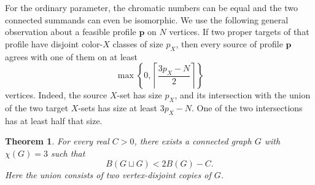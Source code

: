 \documentclass[11pt,reqno]{amsart}
\numberwithin{equation}{section}
\newtheorem{theorem}{Theorem}[section]
\theoremstyle{definition}
\theoremstyle{remark}
\begin{document}
For the ordinary parameter, the chromatic numbers can be equal and
the two connected summands can even be isomorphic. We use the following
general observation about a feasible profile $\mathbf p$ on $N$ vertices.
If two proper targets of that profile have disjoint color-$X$ classes
of size $p_X$, then every source of profile $\mathbf p$ agrees with one
of them on at least
\begin{equation}\label{union:disjoint-class-bound}
 \max\left\{0,\left\lceil\frac{3p_X-N}{2}\right\rceil\right\}
\end{equation}
vertices. Indeed, the source $X$-set has size $p_X$, and its intersection
with the union of the two target $X$-sets has size at least $3p_X-N$.
One of the two intersections has at least half that size.

\begin{theorem}\label{union:strong-counterexample}
For every real $C>0$, there exists a connected graph $G$ with
$\chi(G)=3$ such that
\[
 B(G\sqcup G)<2B(G)-C.
\]
Here the union consists of two vertex-disjoint copies of $G$.
\end{theorem}
\end{document}
